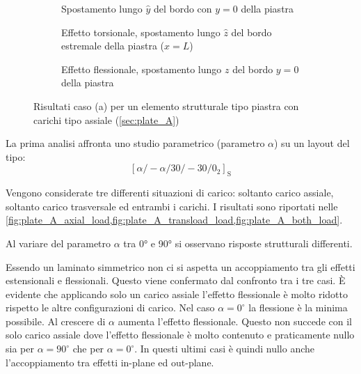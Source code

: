 \documentclass[a4paper,num-refs]{oup-contemporary}
\begin{document}
\begin{figure}[bt!]
	\centering
	
	\begin{subfigure}[t]{0.3\textwidth}
		\centering
		\caption{Spostamento lungo $\hat y$ del bordo con $y=0$ della piastra}
		
	\end{subfigure}
	\hfill
	\begin{subfigure}[t]{0.3\textwidth}
		\centering
		
		\caption{Effetto torsionale, spostamento lungo $\hat z$ del bordo estremale della piastra ($x=L$)}
		
	\end{subfigure}
	\hfill
	\begin{subfigure}[t]{0.3\textwidth}
		\centering
		\caption{Effetto flessionale, spostamento lungo $z$ del bordo $y=0$ della piastra}
		
	\end{subfigure}
	\hfill
	\caption{Risultati caso (a) per un elemento strutturale tipo piastra con carichi tipo assiale (\cref{sec:plate_A})}
	\label{fig:plate_A_axial_load}
\end{figure}



La prima analisi affronta uno studio parametrico (parametro $\alpha$) su un layout del tipo:
\begin{equation}
	\left[\alpha /-\alpha / 30 /-30 / 0_{2}\right]_{\mathrm{S}}
\end{equation}

Vengono considerate tre differenti situazioni di carico: soltanto carico assiale, soltanto carico trasversale ed entrambi i carichi. I risultati sono riportati nelle \cref{fig:plate_A_axial_load,fig:plate_A_transload_load,fig:plate_A_both_load}. 

Al variare del parametro $\alpha$ tra 0° e 90° si osservano risposte strutturali differenti.

Essendo un laminato simmetrico non ci si aspetta un accoppiamento tra gli effetti estensionali e flessionali. Questo viene confermato dal confronto tra i tre casi. È evidente che applicando solo un carico assiale l'effetto flessionale è molto ridotto rispetto le altre configurazioni di carico. Nel caso $\alpha=0^\circ$ la flessione è la minima possibile. Al crescere di $\alpha$ aumenta l'effetto flessionale. Questo non succede con il solo carico assiale dove l'effetto flessionale è molto contenuto e praticamente nullo sia per $\alpha=90^\circ$ che per $\alpha=0^\circ$. In questi ultimi casi è quindi nullo anche l'accoppiamento tra effetti in-plane ed out-plane. 
\end{document}
